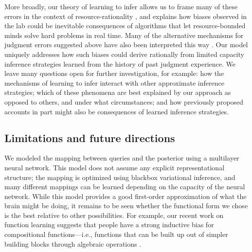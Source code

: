 
More broadly, our theory of learning to infer allows us to frame many of these errors in the context of resource-rationality \citep{lieder2019resource,gershman2015computational}, and explains how biases observed in the lab could be inevitable consequences of algorithms that let resource-bounded minds solve hard problems in real time. Many of the alternative mechanisms for judgment errors suggested above have also been interpreted this way \citep{lieder2018overrepresentation, lieder2017anchoring, parpart2018heuristics}. Our model uniquely addresses how such biases could derive rationally from limited capacity inference strategies learned from the history of past judgment experience. We leave many questions open for further investigation, for example: how the mechanisms of learning to infer interact with other approximate inference strategies; which of these phenomena are best explained by our approach as opposed to others, and under what circumstances; and how previously proposed accounts in part might also be consequences of learned inference strategies.

\subsection{Limitations and future directions}

We modeled the mapping between queries and the posterior using a multilayer neural network. This model does not assume any explicit representational structure; the mapping is optimized using blackbox variational inference, and many different mappings can be learned depending on the capacity of the neural network. While this model provides a good first-order approximation of what the brain might be doing, it remains to be seen whether the functional form we chose is the best relative to other possibilities. For example, our recent work on function learning suggests that people have a strong inductive bias for compositional functions---i.e., functions that can be built up out of simpler building blocks through algebraic operations \citep{schulz2017compositional}.

